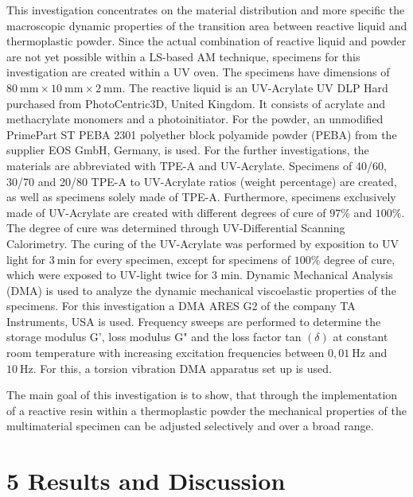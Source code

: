 \documentclass[10pt]{article}
\begin{document}
This investigation concentrates on the material distribution and more specific the macroscopic dynamic properties of the transition area between reactive liquid and thermoplastic powder. Since the actual combination of reactive liquid and powder are not yet possible within a LS-based AM technique, specimens for this investigation are created within a UV oven. The specimens have dimensions of $80 \mathrm{~mm} \times 10 \mathrm{~mm} \times 2 \mathrm{~mm}$. The reactive liquid is an UV-Acrylate UV DLP Hard purchased from PhotoCentric3D, United Kingdom. It consists of acrylate and methacrylate monomers and a photoinitiator. For the powder, an unmodified PrimePart ST PEBA 2301 polyether block polyamide powder (PEBA) from the supplier EOS GmbH, Germany, is used. For the further investigations, the materials are abbreviated with TPE-A and UV-Acrylate. Specimens of 40/60, 30/70 and 20/80 TPE-A to UV-Acrylate ratios (weight percentage) are created, as well as specimens solely made of TPE-A. Furthermore, specimens exclusively made of UV-Acrylate are created with different degrees of cure of $97 \%$ and $100 \%$. The degree of cure was determined through UV-Differential Scanning Calorimetry. The curing of the UV-Acrylate was performed by exposition to UV light for $3 \mathrm{~min}$ for every specimen, except for specimens of $100 \%$ degree of cure, which were exposed to UV-light twice for 3 min. Dynamic Mechanical Analysis (DMA) is used to analyze the dynamic mechanical viscoelastic properties of the specimens. For this investigation a DMA ARES G2 of the company TA Instruments, USA is used. Frequency sweeps are performed to determine the storage modulus G', loss modulus G" and the loss factor tan $(\delta)$ at constant room temperature with increasing excitation frequencies between $0,01 \mathrm{~Hz}$ and $10 \mathrm{~Hz}$. For this, a torsion vibration DMA apparatus set up is used.

The main goal of this investigation is to show, that through the implementation of a reactive resin within a thermoplastic powder the mechanical properties of the multimaterial specimen can be adjusted selectively and over a broad range.

\section*{5 Results and Discussion}
\end{document}
